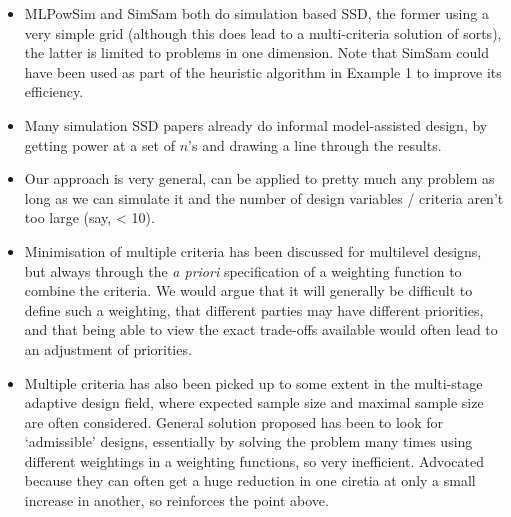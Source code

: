 \documentclass{article} %
\begin{document}
\begin{itemize}

\item MLPowSim and SimSam both do simulation based SSD, the former using a very simple grid (although this does lead to a multi-criteria solution of sorts), the latter is limited to problems in one dimension. Note that SimSam could have been used as part of the heuristic algorithm in Example 1 to improve its efficiency. 
\item Many simulation SSD papers already do informal model-assisted design, by getting power at a set of $n$'s and drawing a line through the results.
\item Our approach is very general, can be applied to pretty much any problem as long as we can simulate it and the number of design variables / criteria aren't too large (say, < 10).

\item Minimisation of multiple criteria has been discussed for multilevel designs, but always through the \emph{a priori} specification of a weighting function to combine the criteria. We would argue that it will generally be difficult to define such a weighting, that different parties may have different priorities, and that being able to view the exact trade-offs available would often lead to an adjustment of priorities. 
\item Multiple criteria has also been picked up to some extent in the multi-stage adaptive design field, where expected sample size and maximal sample size are often considered. General solution proposed has been to look for `admissible' designs, essentially by solving the problem many times using different weightings in a weighting functions, so very inefficient. Advocated because they can often get a huge reduction in one ciretia at only a small increase in another, so reinforces the point above.


\end{itemize}
\end{document}
